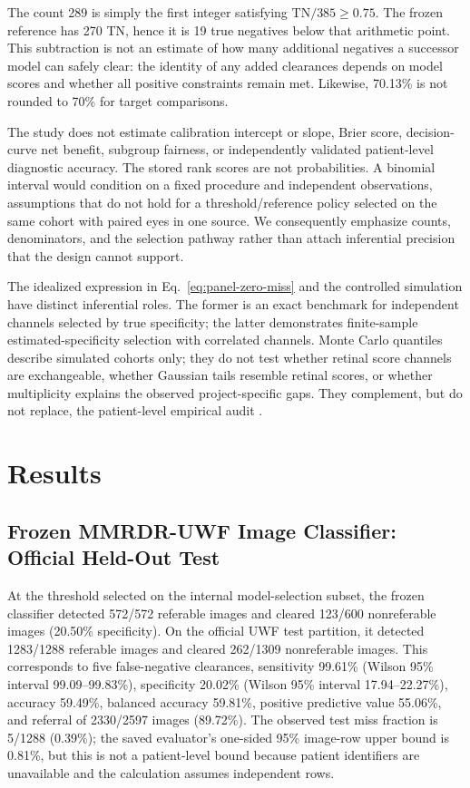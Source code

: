 \documentclass{ieeeaccess}
\begin{document}
The count 289 is simply the first integer satisfying $\mathrm{TN}/385\ge0.75$. The frozen reference has 270 TN, hence it is 19 true negatives below that arithmetic point. This subtraction is not an estimate of how many additional negatives a successor model can safely clear: the identity of any added clearances depends on model scores and whether all positive constraints remain met. Likewise, 70.13\% is not rounded to 70\% for target comparisons.

The study does not estimate calibration intercept or slope, Brier score, decision-curve net benefit, subgroup fairness, or independently validated patient-level diagnostic accuracy. The stored rank scores are not probabilities. A binomial interval would condition on a fixed procedure and independent observations, assumptions that do not hold for a threshold/reference policy selected on the same cohort with paired eyes in one source. We consequently emphasize counts, denominators, and the selection pathway rather than attach inferential precision that the design cannot support.

The idealized expression in Eq.~\eqref{eq:panel-zero-miss} and the controlled simulation have distinct inferential roles. The former is an exact benchmark for independent channels selected by true specificity; the latter demonstrates finite-sample estimated-specificity selection with correlated channels. Monte Carlo quantiles describe simulated cohorts only; they do not test whether retinal score channels are exchangeable, whether Gaussian tails resemble retinal scores, or whether multiplicity explains the observed project-specific gaps. They complement, but do not replace, the patient-level empirical audit \cite{openaiChatGPT}.

\section{Results}
\subsection{Frozen MMRDR-UWF Image Classifier: Official Held-Out Test}
At the threshold selected on the internal model-selection subset, the frozen classifier detected 572/572 referable images and cleared 123/600 nonreferable images (20.50\% specificity). On the official UWF test partition, it detected 1283/1288 referable images and cleared 262/1309 nonreferable images. This corresponds to five false-negative clearances, sensitivity 99.61\% (Wilson 95\% interval 99.09--99.83\%), specificity 20.02\% (Wilson 95\% interval 17.94--22.27\%), accuracy 59.49\%, balanced accuracy 59.81\%, positive predictive value 55.06\%, and referral of 2330/2597 images (89.72\%). The observed test miss fraction is 5/1288 (0.39\%); the saved evaluator's one-sided 95\% image-row upper bound is 0.81\%, but this is not a patient-level bound because patient identifiers are unavailable and the calculation assumes independent rows.
\end{document}
